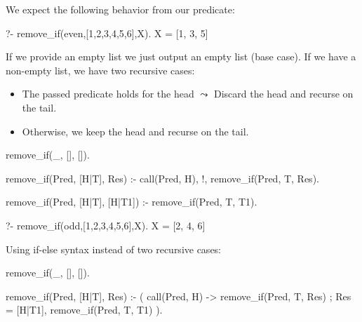 
We expect the following behavior from our predicate:

\begin{codeblock}
?- remove_if(even,[1,2,3,4,5,6],X).
X = [1, 3, 5]
\end{codeblock}

If we provide an empty list we just output an empty list (base case). If we have a non-empty list, we have two recursive cases:
\begin{itemize}
    \item The passed predicate holds for the head $\leadsto$ Discard the head and recurse on the tail.
    \item Otherwise, we keep the head and recurse on the tail.
\end{itemize}

\begin{codeblock}
remove_if(_, [], []).

remove_if(Pred, [H|T], Res) :-
    call(Pred, H), !,
    remove_if(Pred, T, Res).

remove_if(Pred, [H|T], [H|T1]) :-
    remove_if(Pred, T, T1).
\end{codeblock}

\begin{codeblock}
?- remove_if(odd,[1,2,3,4,5,6],X).
X = [2, 4, 6]
\end{codeblock}

\begin{excursion}{}
Using if-else syntax instead of two recursive cases:
\begin{codeblock}
remove_if(_, [], []).

remove_if(Pred, [H|T], Res) :-
    (   call(Pred, H)
    ->  remove_if(Pred, T, Res)
    ;   Res = [H|T1],
        remove_if(Pred, T, T1)
    ).
\end{codeblock}
\end{excursion}


